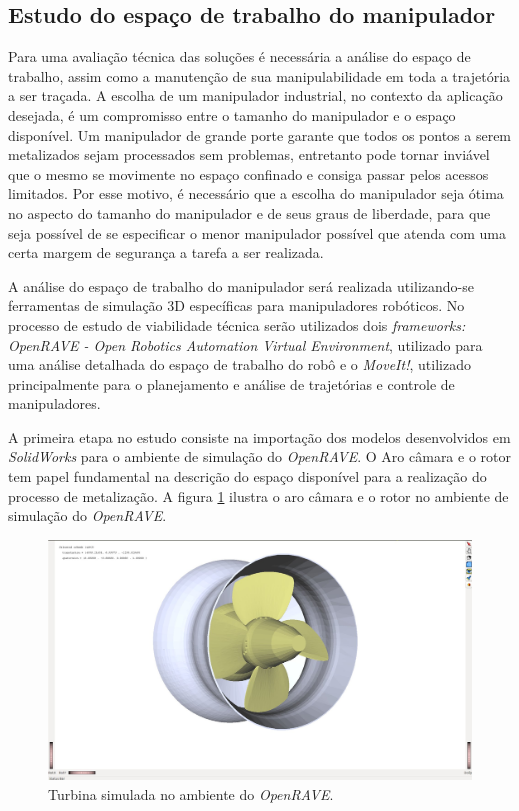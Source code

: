 \subsection{Estudo do espaço de trabalho do manipulador}

Para uma avaliação técnica das soluções é necessária a análise do espaço de
trabalho, assim como a manutenção de sua manipulabilidade em toda a trajetória a
ser traçada. A escolha de um manipulador industrial, no contexto da aplicação
desejada, é um compromisso entre o tamanho do manipulador e o espaço disponível.
Um manipulador de grande porte garante que todos os pontos a serem metalizados
sejam processados sem problemas, entretanto pode tornar inviável que o mesmo se
movimente no espaço confinado e consiga passar pelos acessos limitados. Por esse
motivo, é necessário que a escolha do manipulador seja ótima no aspecto do
tamanho do manipulador e de seus graus de liberdade, para que seja possível de
se especificar o menor manipulador possível que atenda com uma certa margem de
segurança a tarefa a ser realizada.

A análise do espaço de trabalho do manipulador será realizada utilizando-se
ferramentas de simulação 3D específicas para manipuladores robóticos. No
processo de estudo de viabilidade técnica serão utilizados dois
\textit{frameworks:} \textit{OpenRAVE - Open Robotics Automation Virtual
Environment}, utilizado para uma análise detalhada do espaço de trabalho do
robô e o \textit{MoveIt!}, utilizado principalmente para o planejamento e
análise de trajetórias e controle de manipuladores.

A primeira etapa no estudo consiste na importação dos modelos desenvolvidos em
\textit{SolidWorks} para o ambiente de simulação do \textit{OpenRAVE}. O Aro
câmara e o rotor tem papel fundamental na descrição do espaço disponível para a
realização do processo de metalização. A figura \ref{fig::rotor_openrave}
ilustra o aro câmara e o rotor no ambiente de simulação do \textit{OpenRAVE}. 

\begin{figure}[h!]
\centering
	\includegraphics[width=\columnwidth]{figs/openrave/rotor_openrave}
	\caption{Turbina simulada no ambiente do \textit{OpenRAVE}.}
	\label{fig::rotor_openrave}
\end{figure}

